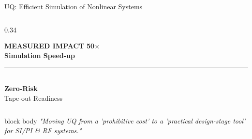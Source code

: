 \begin{frame}[t]{UQ: Efficient Simulation of Nonlinear Systems}
\begin{columns}[T, onlytextwidth]
		\begin{column}{0.34\textwidth}
			\begin{alertblock}{\centering \textbf{MEASURED IMPACT}}
				\centering
				\vspace{1ex}
				{\huge \textbf{50$\times$}} \\
				\footnotesize \textbf{Simulation Speed-up} \\
				\vspace{1.5ex}
				\textcolor{red!20}{\rule{0.8\textwidth}{0.5pt}} \\
				\vspace{1.5ex}
				\small \textbf{Zero-Risk} \\
				\footnotesize Tape-out Readiness
				\vspace{1ex}
			\end{alertblock}
		\end{column}
	\end{columns}

	\vfill
	\begin{beamercolorbox}[wd=\textwidth, sep=1.2ex, center, rounded=true]{block body}
		\small \itshape \textcolor{blue!80!black}{"Moving UQ from a 'prohibitive cost' to a 'practical design-stage tool' for SI/PI \& RF systems."}
	\end{beamercolorbox}
\end{frame}

